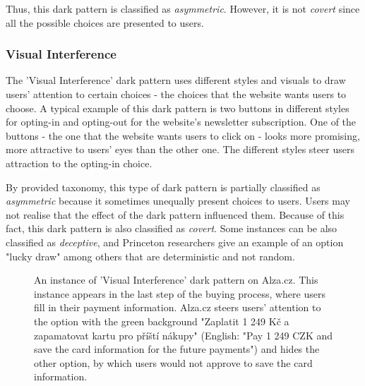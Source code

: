         Thus, this dark pattern is classified as \emph{asymmetric}. However, it is not \emph{covert} since all the possible choices are presented to users.

        \subsubsection{Visual Interference}
        The 'Visual Interference' dark pattern uses different styles and visuals to draw users' attention to certain choices - the choices that the website wants users to choose. A typical example of this dark pattern is two buttons in different styles for opting-in and opting-out for the website's newsletter subscription. One of the buttons - the one that the website wants users to click on - looks more promising, more attractive to users' eyes than the other one. The different styles steer users attraction to the opting-in choice. 
        
        By provided taxonomy, this type of dark pattern is partially classified as \emph{asymmetric} because it sometimes unequally present choices to users. Users may not realise that the effect of the dark pattern influenced them. Because of this fact, this dark pattern is also classified as \emph{covert}. Some instances can be also classified as \emph{deceptive}, and Princeton researchers give an example of an option "lucky draw" among others that are deterministic and not random.
        
        \begin{figure}[ht]
            \centering
            \caption{An instance of 'Visual Interference' dark pattern on Alza.cz. This instance appears in the last step of the buying process, where users fill in their payment information. Alza.cz steers users' attention to the option with the green background "Zaplatit 1 249 Kč a zapamatovat kartu pro příští nákupy" (English: "Pay 1 249 CZK and save the card information for the future payments") and hides the other option, by which users would not approve to save the card information.}
            \label{fig:visual-interference-alza}
        \end{figure}

